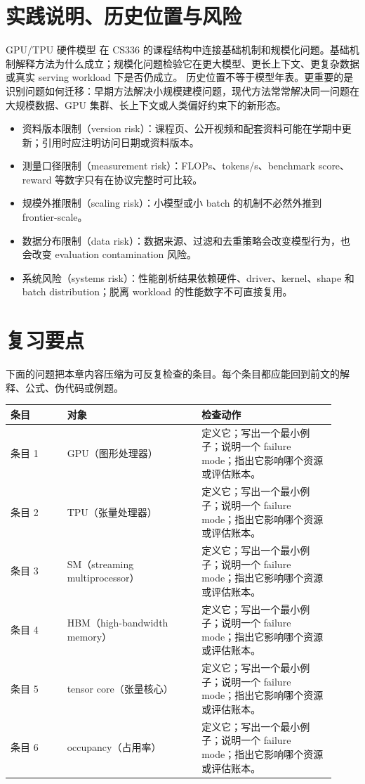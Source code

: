 \documentclass[a4paper]{article}
\begin{document}
\section{实践说明、历史位置与风险}
GPU/TPU 硬件模型 在 CS336 的课程结构中连接基础机制和规模化问题。基础机制解释方法为什么成立；规模化问题检验它在更大模型、更长上下文、更复杂数据或真实 serving workload 下是否仍成立。
历史位置不等于模型年表。更重要的是识别问题如何迁移：早期方法解决小规模建模问题，现代方法常常解决同一问题在大规模数据、GPU 集群、长上下文或人类偏好约束下的新形态。
\begin{itemize}
\item 资料版本限制（version risk）：课程页、公开视频和配套资料可能在学期中更新；引用时应注明访问日期或资料版本。
\item 测量口径限制（measurement risk）：FLOPs、tokens/s、benchmark score、reward 等数字只有在协议完整时可比较。
\item 规模外推限制（scaling risk）：小模型或小 batch 的机制不必然外推到 frontier-scale。
\item 数据分布限制（data risk）：数据来源、过滤和去重策略会改变模型行为，也会改变 evaluation contamination 风险。
\item 系统风险（systems risk）：性能剖析结果依赖硬件、driver、kernel、shape 和 batch distribution；脱离 workload 的性能数字不可直接复用。
\end{itemize}
\section{复习要点}
下面的问题把本章内容压缩为可反复检查的条目。每个条目都应能回到前文的解释、公式、伪代码或例题。
\begin{longtable}{p{0.16\linewidth}p{0.38\linewidth}p{0.38\linewidth}}
\toprule
\textbf{条目} & \textbf{对象} & \textbf{检查动作}\\
\midrule
条目 1 & GPU（图形处理器） & 定义它；写出一个最小例子；说明一个 failure mode；指出它影响哪个资源或评估账本。\\
条目 2 & TPU（张量处理器） & 定义它；写出一个最小例子；说明一个 failure mode；指出它影响哪个资源或评估账本。\\
条目 3 & SM（streaming multiprocessor） & 定义它；写出一个最小例子；说明一个 failure mode；指出它影响哪个资源或评估账本。\\
条目 4 & HBM（high-bandwidth memory） & 定义它；写出一个最小例子；说明一个 failure mode；指出它影响哪个资源或评估账本。\\
条目 5 & tensor core（张量核心） & 定义它；写出一个最小例子；说明一个 failure mode；指出它影响哪个资源或评估账本。\\
条目 6 & occupancy（占用率） & 定义它；写出一个最小例子；说明一个 failure mode；指出它影响哪个资源或评估账本。\\
\bottomrule
\end{longtable}
\end{document}
